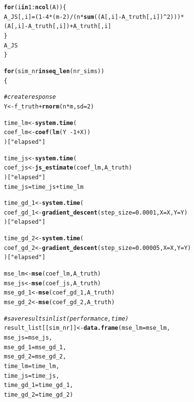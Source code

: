 \documentclass[a4paper]{article}
\makeatletter
\newcommand{\hlnum}[1]{\textcolor[rgb]{0.686,0.059,0.569}{#1}}%
\newcommand{\hlstr}[1]{\textcolor[rgb]{0.192,0.494,0.8}{#1}}%
\newcommand{\hlcom}[1]{\textcolor[rgb]{0.678,0.584,0.686}{\textit{#1}}}%
\newcommand{\hlopt}[1]{\textcolor[rgb]{0,0,0}{#1}}%
\newcommand{\hlstd}[1]{\textcolor[rgb]{0.345,0.345,0.345}{#1}}%
\newcommand{\hlkwa}[1]{\textcolor[rgb]{0.161,0.373,0.58}{\textbf{#1}}}%
\newcommand{\hlkwb}[1]{\textcolor[rgb]{0.69,0.353,0.396}{#1}}%
\newcommand{\hlkwc}[1]{\textcolor[rgb]{0.333,0.667,0.333}{#1}}%
\newcommand{\hlkwd}[1]{\textcolor[rgb]{0.737,0.353,0.396}{\textbf{#1}}}%
\newenvironment{kframe}{%
 \def\at@end@of@kframe{}%
 \ifinner\ifhmode%
  \def\at@end@of@kframe{\end{minipage}}%
  \begin{minipage}{\columnwidth}%
 \fi\fi%
 \def\FrameCommand##1{\hskip\@totalleftmargin \hskip-\fboxsep
 \colorbox{shadecolor}{##1}\hskip-\fboxsep
     \hskip-\linewidth \hskip-\@totalleftmargin \hskip\columnwidth}%
 \MakeFramed {\advance\hsize-\width
   \@totalleftmargin\z@ \linewidth\hsize
   \@setminipage}}%
 {\par\unskip\endMakeFramed%
 \at@end@of@kframe}
\newenvironment{knitrout}{}{} %
\makeatother
\begin{document}
{\begin{enumerate}
\begin{knitrout}
\begin{kframe}
\begin{alltt}
        \hlkwa{for}\hlstd{(i} \hlkwa{in} \hlnum{1}\hlopt{:}\hlkwd{ncol}\hlstd{(A))\{}
                \hlstd{A_JS[,i]}\hlkwb{=} \hlstd{(}\hlnum{1}\hlopt{-}\hlnum{4}\hlopt{*}\hlstd{(m}\hlopt{-}\hlnum{2}\hlstd{)}\hlopt{/}\hlstd{(n}\hlopt{*}\hlkwd{sum}\hlstd{((A[,i]}\hlopt{-}\hlstd{A_truth[,i])}\hlopt{^}\hlnum{2}\hlstd{)))}\hlopt{*}
                  \hlstd{(A[,i]}\hlopt{-}\hlstd{A_truth[,i])}\hlopt{+}\hlstd{A_truth[,i]}
        \hlstd{\}}
\hlstd{A_JS}
\hlstd{\}}

\hlkwa{for}\hlstd{(sim_nr} \hlkwa{in} \hlkwd{seq_len}\hlstd{(nr_sims))}
\hlstd{\{}

  \hlcom{# create response}
  \hlstd{Y} \hlkwb{<-} \hlstd{f_truth} \hlopt{+} \hlkwd{rnorm}\hlstd{(n}\hlopt{*}\hlstd{m,} \hlkwc{sd} \hlstd{=} \hlnum{2}\hlstd{)}

  \hlstd{time_lm} \hlkwb{<-} \hlkwd{system.time}\hlstd{(}
    \hlstd{coef_lm} \hlkwb{<-} \hlkwd{coef}\hlstd{(}\hlkwd{lm}\hlstd{(Y}\hlopt{~-}\hlnum{1}\hlopt{+}\hlstd{X))}
  \hlstd{)[}\hlstr{"elapsed"}\hlstd{]}

  \hlstd{time_js} \hlkwb{<-} \hlkwd{system.time}\hlstd{(}
    \hlstd{coef_js} \hlkwb{<-} \hlkwd{js_estimate}\hlstd{(coef_lm,A_truth)}
  \hlstd{)[}\hlstr{"elapsed"}\hlstd{]}
  \hlstd{time_js} \hlkwb{=} \hlstd{time_js} \hlopt{+} \hlstd{time_lm}

  \hlstd{time_gd_1} \hlkwb{<-} \hlkwd{system.time}\hlstd{(}
    \hlstd{coef_gd_1} \hlkwb{<-} \hlkwd{gradient_descent}\hlstd{(}\hlkwc{step_size} \hlstd{=} \hlnum{0.0001}\hlstd{,} \hlkwc{X} \hlstd{= X,} \hlkwc{Y} \hlstd{= Y)}
  \hlstd{)[}\hlstr{"elapsed"}\hlstd{]}

  \hlstd{time_gd_2} \hlkwb{<-} \hlkwd{system.time}\hlstd{(}
    \hlstd{coef_gd_2} \hlkwb{<-} \hlkwd{gradient_descent}\hlstd{(}\hlkwc{step_size} \hlstd{=} \hlnum{0.00005}\hlstd{,} \hlkwc{X} \hlstd{= X,} \hlkwc{Y} \hlstd{= Y)}
  \hlstd{)[}\hlstr{"elapsed"}\hlstd{]}


  \hlstd{mse_lm} \hlkwb{<-} \hlkwd{mse}\hlstd{(coef_lm, A_truth)}
  \hlstd{mse_js} \hlkwb{<-} \hlkwd{mse}\hlstd{(coef_js, A_truth)}
  \hlstd{mse_gd_1} \hlkwb{<-} \hlkwd{mse}\hlstd{(coef_gd_1, A_truth)}
  \hlstd{mse_gd_2} \hlkwb{<-} \hlkwd{mse}\hlstd{(coef_gd_2, A_truth)}

  \hlcom{# save results in list (performance, time)}
  \hlstd{result_list[[sim_nr]]} \hlkwb{<-} \hlkwd{data.frame}\hlstd{(}\hlkwc{mse_lm} \hlstd{= mse_lm,}
                                                  \hlkwc{mse_js} \hlstd{= mse_js,}
                                      \hlkwc{mse_gd_1} \hlstd{= mse_gd_1,}
                                      \hlkwc{mse_gd_2} \hlstd{= mse_gd_2,}
                                      \hlkwc{time_lm} \hlstd{= time_lm,}
                                      \hlkwc{time_js} \hlstd{= time_js,}
                                      \hlkwc{time_gd_1} \hlstd{= time_gd_1,}
                                      \hlkwc{time_gd_2} \hlstd{= time_gd_2)}


\end{alltt}
\end{kframe}
\end{knitrout}
\end{enumerate}}
\end{document}
